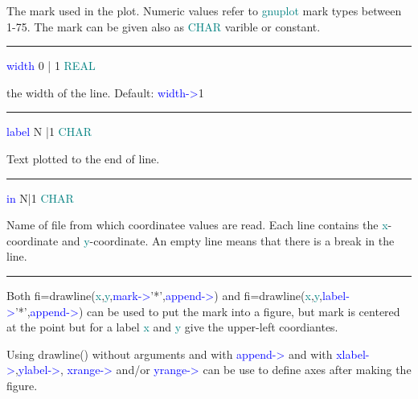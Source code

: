 \begin{changemargin}{3cm}{0cm} 
\noindent  The mark used in the plot. 
Numeric values refer to \textcolor{teal}{gnuplot} mark types between 1-75. 
The mark can be given also as \textcolor{teal}{CHAR} varible or constant. 
\end{changemargin} 
\vspace{0.3cm} 
\hrule 
\vspace{0.3cm} 
\noindent \textcolor{blue}{width}  \tabto{3cm}  0 | 1  \tabto{5cm}   \textcolor{teal}{REAL}  \tabto{7cm} 
\begin{changemargin}{3cm}{0cm} 
\noindent  the width of the line. Default: \textcolor{blue}{width->}1 
\end{changemargin} 
\vspace{0.3cm} 
\hrule 
\vspace{0.3cm} 
\noindent \textcolor{blue}{label} \tabto{3cm}  N |1  \tabto{5cm}  \textcolor{teal}{CHAR}  \tabto{7cm} 
\begin{changemargin}{3cm}{0cm} 
\noindent  Text plotted to the end of line. 
\end{changemargin} 
\vspace{0.3cm} 
\hrule 
\vspace{0.3cm} 
\noindent \textcolor{blue}{in}  \tabto{3cm} N|1 \tabto{5cm}  \textcolor{teal}{CHAR}  \tabto{7cm} 
\begin{changemargin}{3cm}{0cm} 
\noindent  Name of file from which coordinatee values are read. Each line contains 
the \textcolor{teal}{x}-coordinate and \textcolor{teal}{y}-coordinate. An empty line means that there is a break in the line. 
\end {changemargin} 
\hrule 
\vspace{0.2cm} 
\begin{note} 
Both  fi=\textcolor{VioletRed}{drawline}(\textcolor{teal}{x},\textcolor{teal}{y},\textcolor{blue}{mark->}'*',\textcolor{blue}{append->}) and fi=\textcolor{VioletRed}{drawline}(\textcolor{teal}{x},\textcolor{teal}{y},\textcolor{blue}{label->}'*',\textcolor{blue}{append->}) can 
be used to put the mark into a figure, but mark is centered at the point but 
for a label \textcolor{teal}{x} and \textcolor{teal}{y} give the upper-left coordiantes. 
\end{note} 
\begin{note} 
Using \textcolor{VioletRed}{drawline}() without arguments and with \textcolor{blue}{append->} and with \textcolor{blue}{xlabel->},\textcolor{blue}{ylabel->}, 
\textcolor{blue}{xrange->} and/or \textcolor{blue}{yrange->} 
can be use to define axes after making the figure. 
\end{note} 
